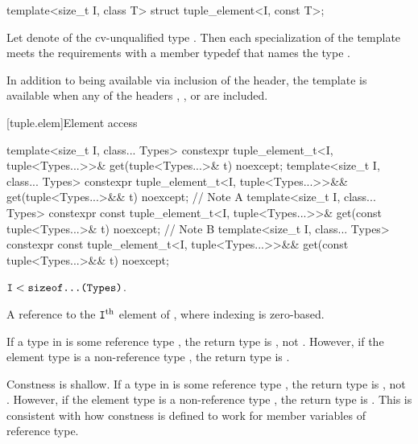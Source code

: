 %
\begin{itemdecl}
template<size_t I, class T> struct tuple_element<I, const T>;
\end{itemdecl}

\begin{itemdescr}
\pnum
Let  denote  of the cv-unqualified type . Then
each specialization of the template meets the  requirements
with a member typedef  that names the type .

\pnum
In addition to being available via inclusion of the  header,
the template is available
when any of the headers
,
, or
are included.
\end{itemdescr}

[tuple.elem]{Element access}

%
\begin{itemdecl}
template<size_t I, class... Types>
  constexpr tuple_element_t<I, tuple<Types...>>&
    get(tuple<Types...>& t) noexcept;
template<size_t I, class... Types>
  constexpr tuple_element_t<I, tuple<Types...>>&&
    get(tuple<Types...>&& t) noexcept;        // Note A
template<size_t I, class... Types>
  constexpr const tuple_element_t<I, tuple<Types...>>&
    get(const tuple<Types...>& t) noexcept;   // Note B
template<size_t I, class... Types>
  constexpr const tuple_element_t<I, tuple<Types...>>&& get(const tuple<Types...>&& t) noexcept;
\end{itemdecl}

\begin{itemdescr}
\pnum
\mandates
$\texttt{I} < \texttt{sizeof...(Types)}$.

\pnum
\returns
A reference to the $\texttt{I}^\text{th}$ element of , where
indexing is zero-based.

\pnum
\begin{note}
[Note A]
If a type  in  is some reference type ,
the return type is , not .
However, if the element type is a non-reference type ,
the return type is .
\end{note}

\pnum
\begin{note}
[Note B]
Constness is shallow.
If a type  in  is some reference type ,
the return type is , not .
However, if the element type is a non-reference type ,
the return type is .
This is consistent with how constness is defined to work
for member variables of reference type.
\end{note}
\end{itemdescr}


